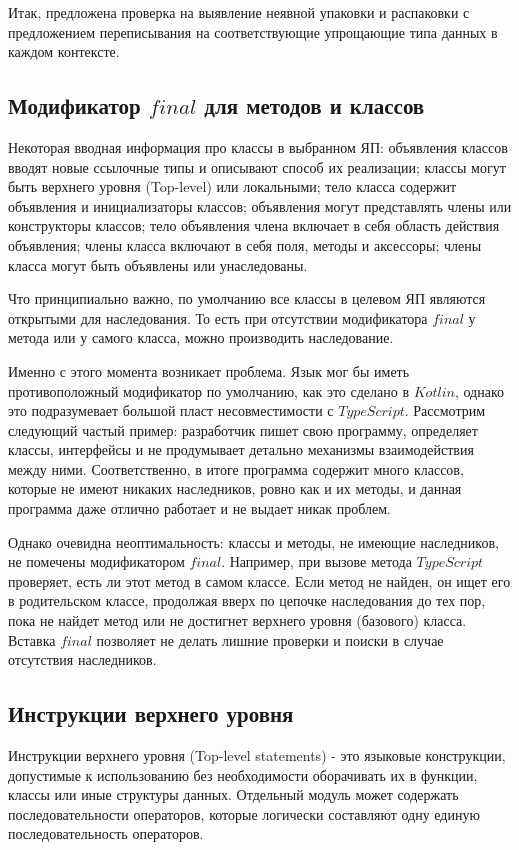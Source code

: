\documentclass{mipt-thesis-bs}
\begin{document}
Итак, предложена проверка на выявление неявной упаковки и распаковки с предложением
переписывания на соответствующие упрощающие типа данных в каждом контексте.


\subsection{Модификатор $final$ для методов и классов}

Некоторая вводная информация про классы в выбранном ЯП: объявления классов 
вводят новые ссылочные типы и описывают способ их реализации;
классы могут быть верхнего уровня (Top-level) или локальными;
тело класса содержит объявления и инициализаторы классов;
объявления могут представлять члены или конструкторы классов;
тело объявления члена включает в себя область действия объявления;
члены класса включают в себя поля, методы и аксессоры; члены класса могут 
быть объявлены или унаследованы.

Что принципиально важно, по умолчанию все классы в целевом ЯП являются открытыми
для наследования. То есть при отсутствии модификатора $final$ у метода или 
у самого класса, можно производить наследование.

Именно с этого момента возникает проблема. Язык мог бы иметь противоположный
модификатор по умолчанию, как это сделано в $Kotlin$, однако это подразумевает большой пласт несовместимости
с $TypeScript$. Рассмотрим следующий частый пример: разработчик пишет свою программу, 
определяет классы, интерфейсы и не продумывает детально механизмы взаимодействия между ними.
Соответственно, в итоге программа содержит много классов, которые не имеют никаких 
наследников, ровно как и их методы, и данная программа даже отлично работает и не выдает
никак проблем.

Однако очевидна неоптимальность: классы  и методы, не имеющие наследников,
не помечены модификатором $final$. Например, при вызове метода $TypeScript$ проверяет,
есть ли этот метод
в самом классе. Если метод не найден, он ищет его в родительском классе,
продолжая вверх по цепочке наследования до тех пор, пока не найдет метод
или не достигнет верхнего уровня (базового) класса. Вставка $final$ позволяет
не делать лишние проверки и поиски в случае отсутствия наследников.


\subsection{Инструкции верхнего уровня}

Инструкции верхнего уровня (Top-level statements) - это языковые конструкции, допустимые
к использованию без необходимости оборачивать их в функции, классы или иные структуры
данных. Отдельный модуль может содержать последовательности операторов,
которые логически составляют одну единую последовательность операторов.
\end{document}
